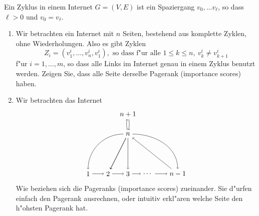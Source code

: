 \documentclass[a4,11pt]{article}
\begin{document}
\begin{aufgabe}
  Ein Zyklus in einem Internet $G = (V, E)$ ist ein Spaziergang $v_0, \dots v_\ell$, so dass $\ell > 0$ und $v_0 = v_\ell$. 
  
  \begin{enumerate}
  \item
  Wir betrachten ein Internet mit $n$ Seiten, bestehend aus komplette Zyklen, ohne Wiederholungen. Also es gibt Zyklen
  \[
  Z_i = (v^i_1, \dots , v^i_n, v^i_1), \text{ so dass f"ur alle } 1 \leq k \leq n, \ v^i_k \neq v^i_{k+1}
  \]
  f"ur $i = 1, \dots , m$, so dass alle Links im Internet genau in einem Zyklus benutzt werden. Zeigen Sie, dass alle Seite derselbe Pagerank (importance scores) haben.
  \item
  Wir betrachten das Internet
  \[
 \begin{tikzpicture}
 \node (1) at (1,0) {$1$};
  \node (2) at (2,0) {$2$};
  \node (3) at (3,0) {$3$};
  \node (4) at (4,0) {$\cdots$};
  \node (5) at (5.5,0) {$n -1$};
  \node (n) at (3,2) {$n$};
  \node (nn) at (3,3) {$n + 1$};
\draw[->] (1)--(2);
\draw[->] (2)--(3);
\draw[->] (3)--(4);
\draw[->] (4)--(5);
\draw[->] (n) [out=180, in=90] to (1);
\draw[->] (n)--(2);
\draw[->] (n)--(2);
\draw[->] (n)--(3);
\draw[->] (5)--(n);
\draw[->] (n) [out=0, in=90] to (5);
\draw[->] (n.100) [out=100, in=260] to (nn.260);
\draw[->] (nn.280) [out=280, in=80] to (n.80);
 \end{tikzpicture}
 \]
  Wie beziehen sich die Pageranks (importance scores) zueinander. Sie d"urfen einfach den Pagerank ausrechnen, oder intuitiv erkl"aren welche Seite den h"ohsten Pagerank hat.
  \end{enumerate}
\end{aufgabe}
\end{document}
